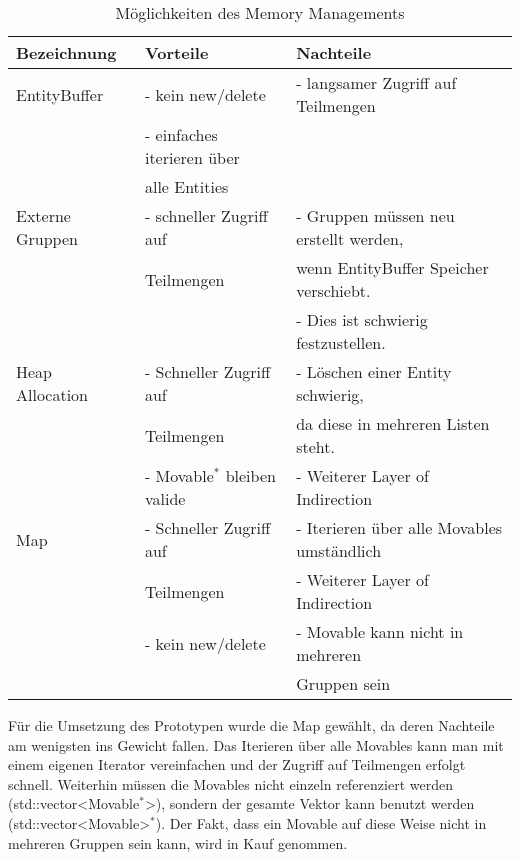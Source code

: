 \documentclass[11pt,a4paper]{article}
\begin{document}
\begin{center}
\begin{table}[!ht]
\begin{tabular}{l | l | l}
\textbf{Bezeichnung} & \textbf{Vorteile} & \textbf{Nachteile}\\
\hline
EntityBuffer & - kein new/delete & - langsamer Zugriff auf Teilmengen \\
& - einfaches iterieren über\\
& \hspace{4pt} alle Entities\\
 \hline
Externe Gruppen & - schneller Zugriff auf & - Gruppen müssen neu erstellt werden, \\
& \hspace{4pt} Teilmengen &\hspace{4pt}  wenn EntityBuffer Speicher verschiebt. \\
& & - Dies ist schwierig festzustellen. \\
\hline
Heap Allocation & - Schneller Zugriff auf & - Löschen einer Entity schwierig, \\
& \hspace{4pt} Teilmengen & \hspace{4pt} da diese in mehreren Listen steht. \\
& - Movable$^\ast$ bleiben valide & - Weiterer Layer of Indirection\\
\hline
Map & - Schneller Zugriff auf & - Iterieren über alle Movables umständlich \\
& \hspace{4pt} Teilmengen & - Weiterer Layer of Indirection\\
& - kein new/delete& - Movable kann nicht in mehreren \\
& & \hspace{4pt} Gruppen sein \\
\end{tabular}
\captionsetup{justification=centering}
\caption[Möglichkeiten des Memory Managements]{Möglichkeiten des Memory Managements}
\end{table}
\end{center}
\normalsize
Für die Umsetzung des Prototypen wurde die Map gewählt, da deren Nachteile am wenigsten ins Gewicht fallen. Das Iterieren über alle Movables kann man mit einem eigenen Iterator vereinfachen und der Zugriff auf Teilmengen erfolgt schnell. Weiterhin müssen die Movables nicht einzeln referenziert werden (std::vector\textless Movable$^\ast$\textgreater), sondern der gesamte Vektor kann benutzt werden (std::vector\textless Movable\textgreater$^\ast$). Der Fakt, dass ein Movable auf diese Weise nicht in mehreren Gruppen sein kann, wird in Kauf genommen.
\end{document}
